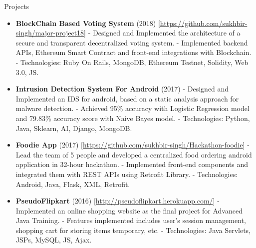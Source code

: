 \documentclass[]{mcdowellcv}
\begin{document}
	\begin{cvsection}{Projects}
		\begin{cvsubsection}{}{}{}
			\begin{itemize}
				\item \textbf{BlockChain Based Voting System} (2018) \textcolor[rgb]{.2,.2,.2}{[\href {https://github.com/sukhbir-singh/major-project18}{https://github.com/sukhbir-singh/major-project18}]}
				\newline- Designed and Implemented the architecture of a secure and transparent decentralized voting system.
				\newline- Implemented backend APIs, Ethereum Smart Contract and front-end integrations with Blockchain.
				\newline- Technologies: Ruby On Rails, MongoDB, Ethereum Testnet, Solidity, Web 3.0, JS.
				\newline
				\item \textbf{Intrusion Detection System For Android} (2017) 
				\newline- Designed and Implemented an IDS for android, based on a static analysis approach for malware detection.
				\newline- Achieved 95\% accuracy with Logistic Regression model and 79.83\% accuracy score with Naive Bayes model.
				\newline- Technologies: Python, Java, Sklearn, AI, Django, MongoDB.
				\newline
				\item \textbf{Foodie App} (2017) \textcolor[rgb]{.2,.2,.2}{[\href {https://github.com/sukhbir-singh/Hackathon-foodie}{https://github.com/sukhbir-singh/Hackathon-foodie}]}
				\newline- Lead the team of 5 people and developed a centralized food ordering android application in 32-hour hackathon.
				\newline- Implemented front-end components and integrated them with REST APIs using Retrofit Library.
				\newline- Technologies: Android, Java, Flask, XML, Retrofit.
				\newline
				\item \textbf{PseudoFlipkart} (2016) \textcolor[rgb]{.2,.2,.2}{[\href {http://pseudoflipkart.herokuapp.com/}{http://pseudoflipkart.herokuapp.com/}]}
				\newline- Implemented an online shopping website as the final project for Advanced Java Training.
				\newline- Features implemented includes user's session management, shopping cart for storing items temporary, etc.
				\newline- Technologies: Java Servlets, JSPs, MySQL, JS, Ajax.

			\end{itemize}
		\end{cvsubsection}
	\end{cvsection}
\end{document}

